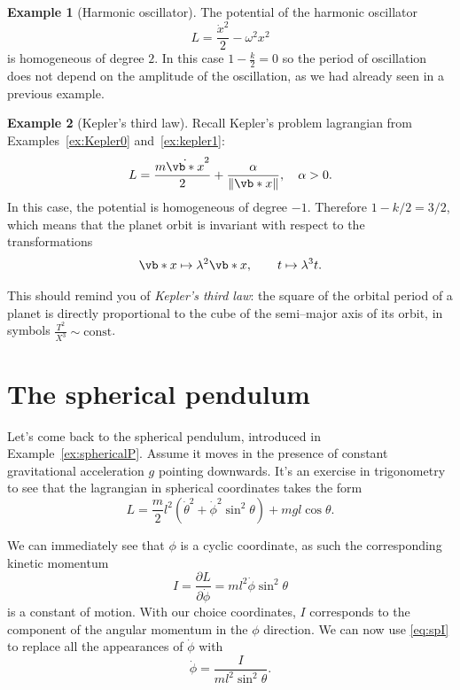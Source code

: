 \documentclass[english,fontsize=11pt,paper=b5]{scrbook}
\theoremstyle{definition}
\newtheorem{example}{Example}[chapter]
\begin{document}
    \begin{example}[Harmonic oscillator]
      The potential of the harmonic oscillator
      \begin{equation}
        L = \frac{\dot x^2}2 - \omega^2 x^2
      \end{equation}
      is homogeneous of degree $2$. In this case $1-\frac k2 = 0$ so the period of oscillation does not depend on the amplitude of the oscillation, as we had already seen in a previous example.
    \end{example}

    \begin{example}[Kepler's third law]
      Recall Kepler's problem lagrangian from Examples~\ref{ex:Kepler0} and~\ref{ex:kepler1}:
      \begin{equation}
        L = \frac{m \dot{\vb*{x}}^2}{2} + \frac{\alpha}{\|\vb*{x}\|}, \quad \alpha >0.
      \end{equation}
      In this case, the potential is homogeneous of degree $-1$. Therefore $1-k/2 = 3/2$, which means that the planet orbit is invariant with respect to the transformations
      \begin{equation}
        \vb*{x} \mapsto \lambda^2 \vb*{x}, \qquad t \mapsto \lambda^3 t.
      \end{equation}

      This should remind you of \emph{Kepler's third law}: the square of the orbital period of a planet is directly proportional to the cube of the semi--major axis of its orbit, in symbols $\frac{T^2}{X^3} \sim \mathrm{const}$.
    \end{example}

    \section{The spherical pendulum}\label{sec:sphpen}
    Let's come back to the spherical pendulum, introduced in Example~\ref{ex:sphericalP}.
    Assume it moves in the presence of constant gravitational acceleration $g$ pointing downwards.
    It's an exercise in trigonometry to see that the lagrangian in spherical coordinates takes the form
    \begin{equation}
      L = \frac m2 l^2 \left(\dot \theta^2 + \dot \phi^2 \sin^2\theta\right) + mgl \cos \theta.
    \end{equation}

    We can immediately see that $\phi$ is a cyclic coordinate, as such the corresponding kinetic momentum
    \begin{equation}\label{eq:spI}
      I = \frac{\partial L}{\partial \dot\phi} = m l^2 \dot\phi\sin^2 \theta
    \end{equation}
    is a constant of motion.
    With our choice coordinates, $I$ corresponds to the component of the angular momentum in the $\phi$ direction. We can now use \eqref{eq:spI} to replace all the appearances of $\dot\phi$ with
    \begin{equation}
      \dot\phi = \frac{I}{ml^2 \sin^2\theta}.
    \end{equation}
\end{document}
